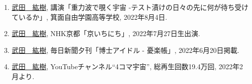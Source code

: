 \documentclass[uplatex, 11pt]{jsarticle}
\begin{document}
\begin{enumerate}
\item \uline{武田　紘樹}, 講演「重力波で覗く宇宙 -テスト漬けの日々の先に何が待ち受けているか」, 箕面自由学園高等学校, 2022年8月4日.\\

\item \uline{武田　紘樹}, NHK京都「京いちにち」, 2022年7月27日生出演.\\

\item \uline{武田　紘樹}, 毎日新聞夕刊「博士アイドル - 憂楽帳」, 2022年6月20日掲載.\\

\item \uline{武田　紘樹}, YouTubeチャンネル“4コマ宇宙”,  総再生回数19.4万回, 2022年2月より.\\
\end{enumerate}

\end{document}
